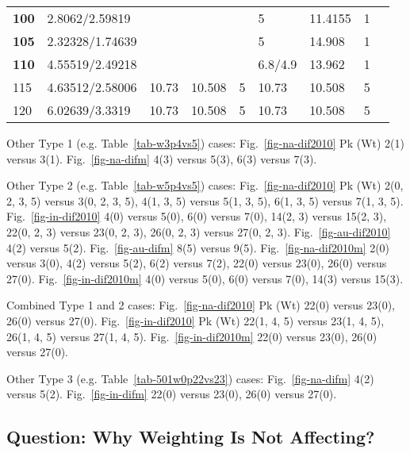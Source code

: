 \begin{table}[!ht]
{\begin{tabular}{@{}llllllllll@{}}
\textbf{100} & 2.8062/2.59819 & \multicolumn{3}{l}{} & 5 & 11.4155 & 1 & \multicolumn{2}{l}{} \\
\textbf{105} & 2.32328/1.74639 & \multicolumn{3}{l}{} & 5 & 14.908 & 1 & \multicolumn{2}{l}{} \\
\textbf{110} & 4.55519/2.49218 & \multicolumn{3}{l}{} & 6.8/4.9 & 13.962 & 1 & \multicolumn{2}{l}{} \\
115 & 4.63512/2.58006 & 10.73 & 10.508 & 5 & 10.73 & 10.508 & 5 & \multicolumn{2}{l}{} \\
120 & 6.02639/3.3319 & 10.73 & 10.508 & 5 & 10.73 & 10.508 & 5 & \multicolumn{2}{l}{} \\ \cmidrule(r){1-8}
\end{tabular}%
}
\end{table}

Other Type 1 (e.g. Table~\ref{tab-w3p4vs5}) cases: Fig.~\ref{fig-na-dif2010}
Pk (Wt) 2(1) versus 3(1). Fig.~\ref{fig-na-difm} 4(3) versus 5(3), 6(3) versus 7(3).

Other Type 2 (e.g. Table~\ref{tab-w5p4vs5}) cases: Fig.~\ref{fig-na-dif2010}
Pk (Wt) 2(0, 2, 3, 5) versus 3(0, 2, 3, 5), 4(1, 3, 5) versus 5(1, 3, 5), 6(1,
3, 5) versus 7(1, 3, 5). Fig.~\ref{fig-in-dif2010} 4(0) versus 5(0),
6(0) versus 7(0), 14(2, 3) versus 15(2, 3), 22(0, 2, 3) versus 23(0, 2, 3),
26(0, 2, 3) versus 27(0, 2, 3). Fig.~\ref{fig-au-dif2010} 4(2) versus 5(2).
Fig.~\ref{fig-au-difm} 8(5) versus 9(5). Fig.~\ref{fig-na-dif2010m} 2(0)
versus 3(0), 4(2) versus 5(2), 6(2) versus 7(2), 22(0) versus
23(0), 26(0) versus 27(0).
Fig.~\ref{fig-in-dif2010m} 4(0) versus 5(0), 6(0)
versus 7(0), 14(3) versus 15(3).

Combined Type 1 and 2 cases: Fig.~\ref{fig-na-dif2010} Pk (Wt)
22(0) versus 23(0), 26(0) versus 27(0).
Fig.~\ref{fig-in-dif2010} Pk (Wt) 22(1, 4, 5) versus 23(1, 4, 5), 26(1, 4, 5) versus
27(1, 4, 5). Fig.~\ref{fig-in-dif2010m} 22(0) versus 23(0),
26(0) versus 27(0).

Other Type 3 (e.g. Table~\ref{tab-501w0p22vs23}) cases: Fig.~\ref{fig-na-difm}
4(2) versus 5(2). Fig.~\ref{fig-in-difm} 22(0)
versus 23(0), 26(0) versus 27(0).


\subsection{Question: Why Weighting Is Not Affecting?}

